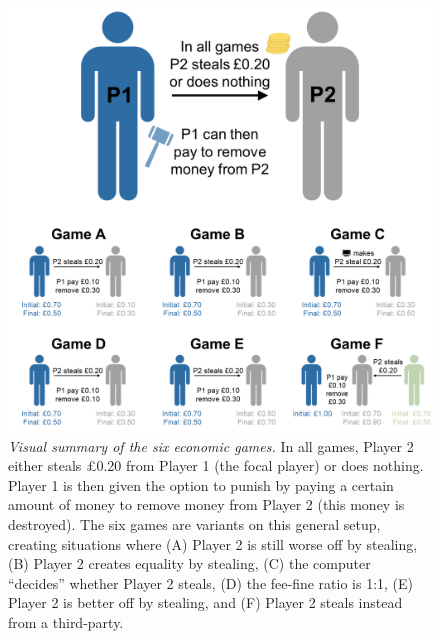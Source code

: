 \documentclass[
  man,floatsintext]{apa6}
\begin{document}
\begin{figure}
\includegraphics[width=1\linewidth]{images/games} \caption{\emph{Visual summary of the six economic games.} In all
games, Player 2 either steals £0.20 from Player 1 (the focal player) or does
nothing. Player 1 is then given the option to punish by paying a certain amount
of money to remove money from Player 2 (this money is destroyed). The six games
are variants on this general setup, creating situations where (A) Player 2 is
still worse off by stealing, (B) Player 2 creates equality by stealing, (C) the
computer ``decides'' whether Player 2 steals, (D) the fee-fine ratio is 1:1, (E)
Player 2 is better off by stealing, and (F) Player 2 steals instead from a
third-party.}\label{fig:plotGames}
\end{figure}
\end{document}
